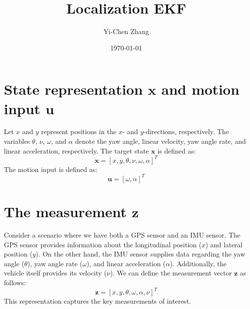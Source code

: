 \documentclass[12pt, a4paper]{article}
\title{Localization EKF}
\author{Yi-Chen Zhang}
\date{\today}
\begin{document}
\maketitle

\section{State representation $\bm{x}$ and motion input $\bm{u}$}
Let $x$ and $y$ represent positions in the $x$- and $y$-directions, respectively. The variables $\theta$, $\nu$, $\omega$, and $\alpha$ denote the yaw angle, linear velocity, yaw angle rate, and linear acceleration, respectively. The target state $\bm{x}$ is defined as:
\[
  \bm{x} = [x, y, \theta, \nu, \omega, \alpha]^{T}
\]
The motion input is defined as:
\[
  \bm{u} = [\omega, \alpha]^{T}
\]

\section{The measurement $\bm{z}$}
Consider a scenario where we have both a GPS sensor and an IMU sensor. The GPS sensor provides information about the longitudinal position ($x$) and lateral position ($y$). On the other hand, the IMU sensor supplies data regarding the yaw angle ($\theta$), yaw angle rate ($\omega$), and linear acceleration ($\alpha$). Additionally, the vehicle itself provides its velocity ($\nu$). We can define the measurement vector $\bm{z}$ as follows:
\[
  \bm{z} = [x, y, \theta, \omega, \alpha, \nu]^{T}
\]
This representation captures the key measurements of interest.
\end{document}
